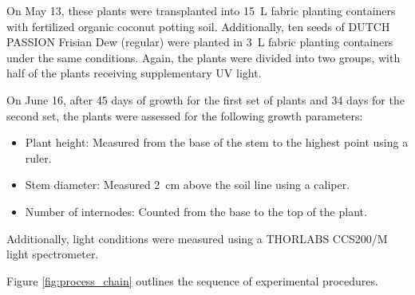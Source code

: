 On May 13, these plants were transplanted into \qty[mode=text]{15}{\L} fabric planting containers with fertilized organic coconut potting soil. Additionally, ten seeds of DUTCH PASSION Frisian Dew (regular) were planted in \qty[mode=text]{3}{\L} fabric planting containers under the same conditions. Again, the plants were divided into two groups, with half of the plants receiving supplementary UV light.

On June 16, after \num[mode=text]{45} days of growth for the first set of plants and \num[mode=text]{34} days for the second set, the plants were assessed for the following growth parameters:
\begin{itemize}
    \item Plant height: Measured from the base of the stem to the highest point using a ruler.
    \item Stem diameter: Measured \qty[mode=text]{2}{\cm} above the soil line using a caliper.
    \item Number of internodes: Counted from the base to the top of the plant.
\end{itemize}

Additionally, light conditions were measured using a THORLABS CCS200/M light spectrometer.

Figure \ref{fig:process_chain} outlines the sequence of experimental procedures.

